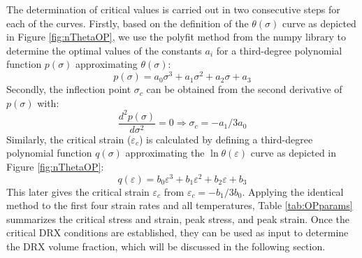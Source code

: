 \documentclass[metals,article,submit,pdftex,moreauthors]{Definitions/mdpi}
\begin{document}
The determination of critical values is carried out in two consecutive steps for each of the curves.
Firstly, based on the definition of the $\theta(\sigma)$ curve as depicted in Figure \ref{fig:nThetaOP}, we use the polyfit method from the numpy library to determine the optimal values of the constants $a_i$ for a third-degree polynomial function $p(\sigma)$ approximating $\theta(\sigma)$:
\begin{equation}
p(\sigma) = a_0\sigma^3 + a_1\sigma^2 + a_2\sigma + a_3
\end{equation}
Secondly, the inflection point $\sigma_c$ can be obtained from the second derivative of $p(\sigma)$ with:
\begin{equation}
\frac{d^2 p(\sigma)}{d \sigma^2} = 0 \Longrightarrow \sigma_c = -a_1/3a_0
\end{equation}
Similarly, the critical strain ($\varepsilon_c$) is calculated by defining a third-degree polynomial function $q(\sigma)$ approximating the $\ln \theta(\varepsilon)$ curve as depicted in Figure \ref{fig:nThetaOP}:
\begin{equation}
q(\varepsilon) = b_0\varepsilon^3 + b_1\varepsilon^2 + b_2\varepsilon + b_3
\end{equation}
This later gives the critical strain $\varepsilon_c$ from $\varepsilon_c = -b_1/3b_0$.
Applying the identical method to the first four strain rates and all temperatures, Table \ref{tab:OPparams} summarizes the critical stress and strain, peak stress, and peak strain.
Once the critical DRX conditions are established, they can be used as input to determine the DRX volume fraction, which will be discussed in the following section.
\end{document}
